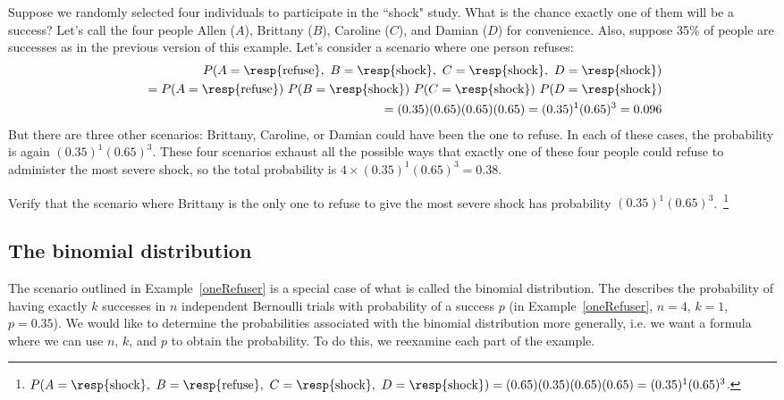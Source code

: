 
\begin{example}{Suppose we randomly selected four individuals to participate in the ``shock" study. What is the chance exactly one of them will be a success?  Let's call the four people Allen ($A$), Brittany ($B$), Caroline ($C$), and Damian ($D$) for convenience. Also, suppose 35\% of people are successes as in the previous version of this example.}\label{oneRefuser}
Let's consider a scenario where one person refuses:
\begin{eqnarray*}
&&P(A=\text{\resp{refuse}},\text{ }B=\text{\resp{shock}},\text{ }C=\text{\resp{shock}},\text{ }D=\text{\resp{shock}}) \\
 &&\quad =  P(A=\text{\resp{refuse}})\ P(B=\text{\resp{shock}})\ P(C=\text{\resp{shock}})\ P(D=\text{\resp{shock}}) \\
 &&\quad =  (0.35)  (0.65)  (0.65)  (0.65) = (0.35)^1 (0.65)^3 = 0.096
\end{eqnarray*}
But there are three other scenarios: Brittany, Caroline, or Damian could have been the one to refuse. In each of these cases, the probability is again $(0.35)^1(0.65)^3$. These four scenarios exhaust all the possible ways that exactly one of these four people could refuse to administer the most severe shock, so the total probability is $4\times(0.35)^1(0.65)^3 = 0.38$.
\end{example}

\begin{exercise}
Verify that the scenario where Brittany is the only one to refuse to give the most severe shock has probability $(0.35)^1(0.65)^3$.~\footnote{$P(A=\text{\resp{shock}},\text{ }B=\text{\resp{refuse}},\text{ }C=\text{\resp{shock}},\text{ }D=\text{\resp{shock}}) = (0.65)(0.35)(0.65)(0.65) = (0.35)^1(0.65)^3$.}
\end{exercise}

\textC{\newpage}


\subsection{The binomial distribution}

The scenario outlined in Example~\ref{oneRefuser} is a special case of what is called the binomial distribution. The  describes the probability of having exactly $k$ successes in $n$ independent Bernoulli trials with probability of a success $p$  (in Example~\ref{oneRefuser}, $n=4$, $k=1$, $p=0.35$). We would like to determine the probabilities associated with the binomial distribution more generally, i.e. we want a formula where we can use $n$, $k$, and $p$ to obtain the probability. To do this, we reexamine each part of the example.


